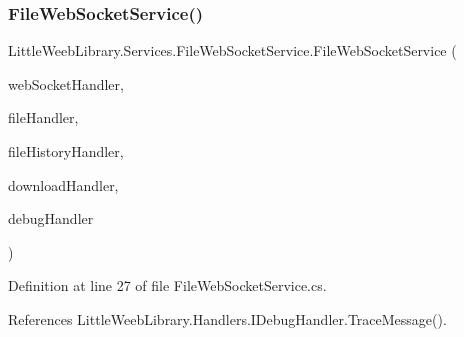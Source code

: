 \subsubsection{\texorpdfstring{File\+Web\+Socket\+Service()}{FileWebSocketService()}}
{\footnotesize\ttfamily Little\+Weeb\+Library.\+Services.\+File\+Web\+Socket\+Service.\+File\+Web\+Socket\+Service (\begin{DoxyParamCaption}\item[{\mbox{\hyperlink{interface_little_weeb_library_1_1_handlers_1_1_i_web_socket_handler}{I\+Web\+Socket\+Handler}}}]{web\+Socket\+Handler,  }\item[{\mbox{\hyperlink{interface_little_weeb_library_1_1_handlers_1_1_i_file_handler}{I\+File\+Handler}}}]{file\+Handler,  }\item[{\mbox{\hyperlink{interface_little_weeb_library_1_1_handlers_1_1_i_file_history_handler}{I\+File\+History\+Handler}}}]{file\+History\+Handler,  }\item[{\mbox{\hyperlink{interface_little_weeb_library_1_1_handlers_1_1_i_download_handler}{I\+Download\+Handler}}}]{download\+Handler,  }\item[{\mbox{\hyperlink{interface_little_weeb_library_1_1_handlers_1_1_i_debug_handler}{I\+Debug\+Handler}}}]{debug\+Handler }\end{DoxyParamCaption})}



Definition at line 27 of file File\+Web\+Socket\+Service.\+cs.



References Little\+Weeb\+Library.\+Handlers.\+I\+Debug\+Handler.\+Trace\+Message().


